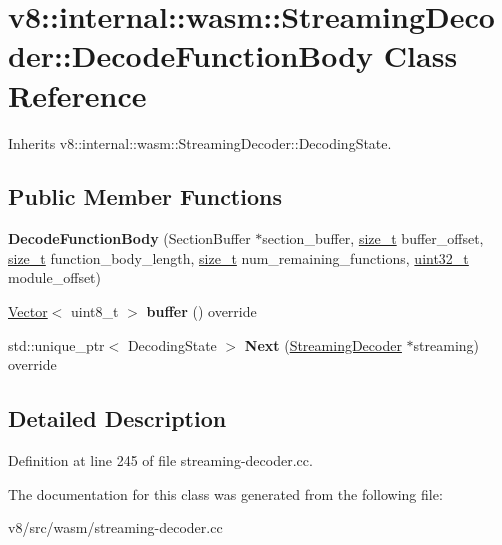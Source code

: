 \hypertarget{classv8_1_1internal_1_1wasm_1_1StreamingDecoder_1_1DecodeFunctionBody}{}\section{v8\+:\+:internal\+:\+:wasm\+:\+:Streaming\+Decoder\+:\+:Decode\+Function\+Body Class Reference}
\label{classv8_1_1internal_1_1wasm_1_1StreamingDecoder_1_1DecodeFunctionBody}


Inherits v8\+::internal\+::wasm\+::\+Streaming\+Decoder\+::\+Decoding\+State.

\subsection*{Public Member Functions}
\begin{DoxyCompactItemize}
\item 
\mbox{\label{classv8_1_1internal_1_1wasm_1_1StreamingDecoder_1_1DecodeFunctionBody_aa7c471a51fac0105d924874907894e46}} 
{\bfseries Decode\+Function\+Body} (Section\+Buffer $\ast$section\+\_\+buffer, \mbox{\hyperlink{classsize__t}{size\+\_\+t}} buffer\+\_\+offset, \mbox{\hyperlink{classsize__t}{size\+\_\+t}} function\+\_\+body\+\_\+length, \mbox{\hyperlink{classsize__t}{size\+\_\+t}} num\+\_\+remaining\+\_\+functions, \mbox{\hyperlink{classuint32__t}{uint32\+\_\+t}} module\+\_\+offset)
\item 
\mbox{\label{classv8_1_1internal_1_1wasm_1_1StreamingDecoder_1_1DecodeFunctionBody_aef748ddaf0b77f43345079c8bba9f5e4}} 
\mbox{\hyperlink{classv8_1_1internal_1_1Vector}{Vector}}$<$ uint8\+\_\+t $>$ {\bfseries buffer} () override
\item 
\mbox{\label{classv8_1_1internal_1_1wasm_1_1StreamingDecoder_1_1DecodeFunctionBody_a71fb684a56b812810f3c60e464efcc6a}} 
std\+::unique\+\_\+ptr$<$ Decoding\+State $>$ {\bfseries Next} (\mbox{\hyperlink{classv8_1_1internal_1_1wasm_1_1StreamingDecoder}{Streaming\+Decoder}} $\ast$streaming) override
\end{DoxyCompactItemize}


\subsection{Detailed Description}


Definition at line 245 of file streaming-\/decoder.\+cc.



The documentation for this class was generated from the following file\+:\begin{DoxyCompactItemize}
\item 
v8/src/wasm/streaming-\/decoder.\+cc\end{DoxyCompactItemize}
